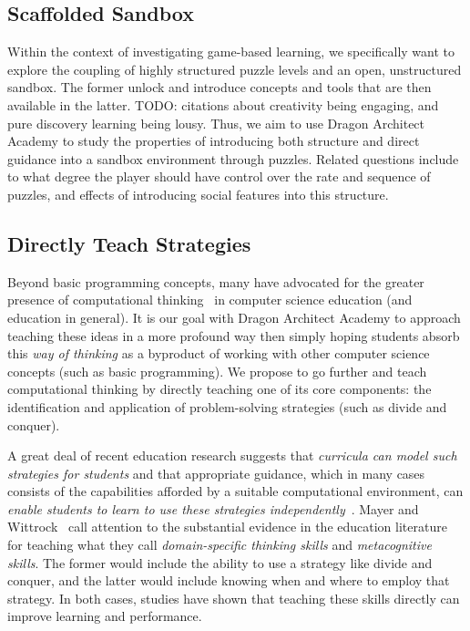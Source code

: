 \documentclass{sig-alternate}
\newcommand{\TODO}[1]{{\color{red} TODO: #1}}
\newcommand{\gametitle}{{\color{RoyalPurple} Dragon Architect Academy}}
\begin{document}
\subsection{Scaffolded Sandbox}
Within the context of investigating game-based learning, we specifically want to explore the coupling of highly structured puzzle levels and an open, unstructured sandbox. The former unlock and introduce concepts and tools that are then available in the latter. \TODO{citations about creativity being engaging, and pure discovery learning being lousy}. Thus, we aim to use \gametitle{} to study the properties of introducing both structure and direct guidance into a sandbox environment through puzzles. Related questions include to what degree the player should have control over the rate and sequence of puzzles, and effects of introducing social features into this structure. 

\subsection{Directly Teach Strategies}

Beyond basic programming concepts, many have advocated for the greater presence of computational thinking~\cite{wing2008computational} in computer science education (and education in general). It is our goal with \gametitle{} to approach teaching these ideas in a more profound way then simply hoping students absorb this \emph{way of thinking} as a byproduct of working with other computer science concepts (such as basic programming). We propose to go further and teach computational thinking by directly teaching one of its core components: the identification and application of problem-solving strategies (such as divide and conquer). 

A great deal of recent education research suggests that \emph{curricula can model such strategies for students} and that appropriate guidance, which in many cases consists of the capabilities afforded by a suitable computational environment, can \emph{enable students to learn to use these strategies independently}~\cite{report2010computational}. Mayer and Wittrock~\cite{mayer1996handbook} call attention to the substantial evidence in the education literature for teaching what they call \emph{domain-specific thinking skills} and \emph{metacognitive skills}. The former would include the ability to use a strategy like divide and conquer, and the latter would include knowing when and where to employ that strategy. In both cases, studies have shown that teaching these skills directly can improve learning and performance. 
\end{document}
